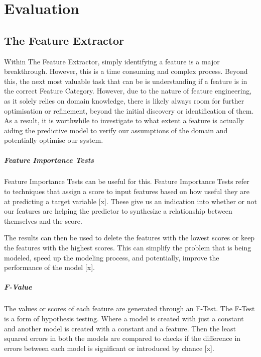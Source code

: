 \chapter{Evaluation}\label{C:eval}

\section{The Feature Extractor}
Within The Feature Extractor, simply identifying a feature is a major breakthrough. However, this is a time consuming and complex process. Beyond this, the next most valuable task that can be is understanding if a feature is in the correct Feature Category. However, due to the nature of feature engineering, as it solely relies on domain knowledge, there is likely always room for further optimisation or refinement, beyond the initial discovery or identification of them. As a result, it is worthwhile to investigate to what extent a feature is actually aiding the predictive model to verify our assumptions of the domain and potentially optimise our system. 

\paragraph{Feature Importance Tests}
Feature Importance Tests can be useful for this. Feature Importance Tests refer to techniques that assign a score to input features based on how useful they are at predicting a target variable [x]. These give us an indication into whether or not our features are helping the predictor to synthesize a relationship between themselves and the score. 

The results can then be used to delete the features with the lowest scores or keep the features with the highest scores. This can simplify the problem that is being modeled, speed up the modeling process, and potentially, improve the performance of the model [x]. 

\paragraph{F-Value}
The values or scores of each feature are generated through an F-Test. The F-Test is a form of hypothesis testing. Where a model is created with just a constant and another model is created with a constant and a feature. Then the least squared errors in both the models are compared to checks if the difference in errors between each model is significant or introduced by chance [x].

